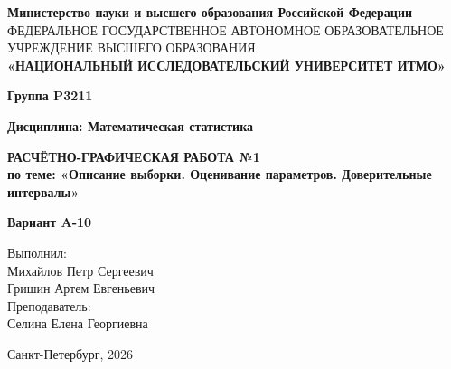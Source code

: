 \documentclass[a4paper,12pt]{article}
\begin{document}
\begin{titlepage}
    \centering
    {\fontsize{11}{13}\selectfont \textbf{Министерство науки и высшего образования Российской Федерации}} \\
    {\fontsize{7}{10}\selectfont ФЕДЕРАЛЬНОЕ ГОСУДАРСТВЕННОЕ АВТОНОМНОЕ ОБРАЗОВАТЕЛЬНОЕ УЧРЕЖДЕНИЕ ВЫСШЕГО ОБРАЗОВАНИЯ} \\
    \vspace{0.2cm} 
    {\fontsize{14}{17}\selectfont \textbf{«НАЦИОНАЛЬНЫЙ ИССЛЕДОВАТЕЛЬСКИЙ УНИВЕРСИТЕТ ИТМО»}}
    
    \vspace{1cm} 
    
    {\fontsize{12}{14}\selectfont \textbf{Группа P3211}}
    
    \vspace{1cm}
    
    {\fontsize{12}{14}\selectfont \textbf{Дисциплина: Математическая статистика}}
    
    \vspace*{\fill}
    
    {\fontsize{18}{22}\selectfont \textbf{РАСЧЁТНО-ГРАФИЧЕСКАЯ РАБОТА №1}} \\
    \vspace{0.5cm}
    {\fontsize{14}{17}\selectfont \textbf{по теме: «Описание выборки. Оценивание параметров. Доверительные интервалы»}}
    
    \vspace{2cm}
    
    {\fontsize{12}{14}\selectfont \textbf{Вариант A-10}}
    
    \vspace{2cm}
    
    \begin{flushright}
        \fontsize{12}{14}\selectfont
        Выполнил: \\
        Михайлов Петр Сергеевич \\
        Гришин Артем Евгеньевич \\
        \vspace{1em}
        Преподаватель: \\
        Селина Елена Георгиевна
    \end{flushright}
    
    \vfill
    
    {\fontsize{12}{14}\selectfont
    Санкт-Петербург, 2026
    }
\end{titlepage}
\end{document}
